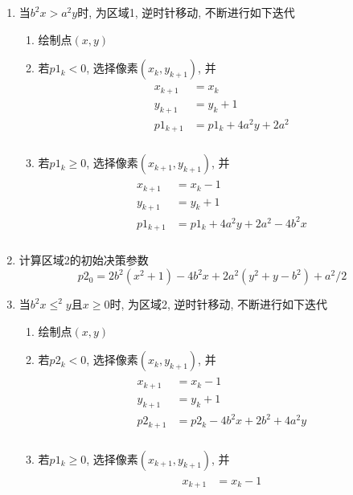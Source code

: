 \documentclass[a4paper,UTF8]{article}
\theoremstyle{definition}
\begin{document}
\begin{itemize}
\begin{enumerate}
    \item 当$b^2x>a^2y$时, 为区域1, 逆时针移动, 不断进行如下迭代\begin{enumerate}
    \item 绘制点$(x,y)$
      \item 若$p1_k<0$, 选择像素$(x_k, y_{k+1})$, 并\begin{align}
        \begin{split}
          x_{k+1} &= x_k\\
          y_{k+1} &= y_k+1\\
          p1_{k+1} &= p1_{k} + 4a^2y + 2a^2\\
        \end{split}
      \end{align}
      \item 若$p1_k\geq 0$, 选择像素$(x_{k+1}, y_{k+1})$, 并\begin{align}
        \begin{split}
          x_{k+1} &= x_k - 1\\
          y_{k+1} &= y_k+1\\
          p1_{k+1} &= p1_{k} + 4a^2y + 2a^2 - 4b^2x\\
        \end{split}
      \end{align}
    \end{enumerate}
    \item 计算区域2的初始决策参数$$p2_0 = 2b^2(x^2+1)-4b^2x+2a^2(y^2+y-b^2) +a^2/2$$
    \item 当$b^2x\leq ^2y$且$x\geq 0$时, 为区域2, 逆时针移动, 不断进行如下迭代\begin{enumerate}
    \item 绘制点$(x,y)$
      \item 若$p2_k<0$, 选择像素$(x_k, y_{k+1})$, 并\begin{align}
        \begin{split}
          x_{k+1} &= x_k - 1\\
          y_{k+1} &= y_k+1\\
          p2_{k+1} &= p2_{k} - 4b^2x + 2b^2 + 4a^2y\\
        \end{split}
      \end{align}
      \item 若$p1_k\geq 0$, 选择像素$(x_{k+1}, y_{k+1})$, 并\begin{align}
        \begin{split}
          x_{k+1} &= x_k - 1\\

\end{split}
\end{align}
\end{enumerate}
\end{enumerate}
\end{itemize}
\end{document}
